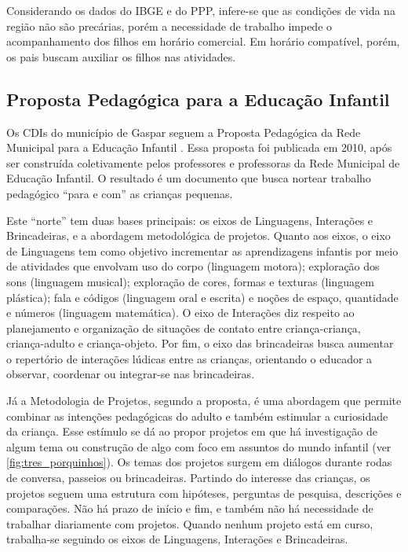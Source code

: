Considerando os dados do IBGE e do PPP, infere-se que as condições de vida na região não são precárias, porém a necessidade de trabalho impede o acompanhamento dos filhos em horário comercial. Em horário compatível, porém, os pais buscam auxiliar os filhos nas atividades.

\subsection{Proposta Pedagógica para a Educação Infantil}
Os CDIs do município de Gaspar seguem a Proposta Pedagógica da Rede Municipal para a Educação Infantil \cite{gaspar_proposta_2010}. Essa proposta foi publicada em 2010, após ser construída coletivamente pelos professores e professoras da Rede Municipal de Educação Infantil. O resultado é um documento que busca nortear trabalho pedagógico “para e com” as crianças pequenas.

Este “norte” tem duas bases principais: os eixos de Linguagens, Interações e Brincadeiras, e a abordagem metodológica de projetos. Quanto aos eixos, o eixo de Linguagens tem como objetivo incrementar as aprendizagens infantis por meio de atividades que envolvam uso do corpo (linguagem motora); exploração dos sons (linguagem musical); exploração de cores, formas e texturas (linguagem plástica); fala e códigos (linguagem oral e escrita) e noções de espaço, quantidade e números (linguagem matemática). O eixo de Interações diz respeito ao planejamento e organização de situações de contato entre criança-criança, criança-adulto e criança-objeto. Por fim, o eixo das brincadeiras busca aumentar o repertório de interações lúdicas entre as crianças, orientando o educador a observar, coordenar ou integrar-se nas brincadeiras.

Já a Metodologia de Projetos, segundo a proposta, é uma abordagem que permite combinar as intenções pedagógicas do adulto e também estimular a curiosidade da criança. Esse estímulo se dá ao propor projetos em que há investigação de algum tema ou construção de algo com foco em assuntos do mundo infantil (ver \autoref{fig:tres_porquinhos}). Os temas dos projetos surgem em diálogos durante rodas de conversa, passeios ou brincadeiras. Partindo do interesse das crianças, os projetos seguem uma estrutura com hipóteses, perguntas de pesquisa, descrições e comparações. Não há prazo de início e fim, e também não há necessidade de trabalhar diariamente com projetos. Quando nenhum projeto está em curso, trabalha-se seguindo os eixos de Linguagens, Interações e Brincadeiras.

